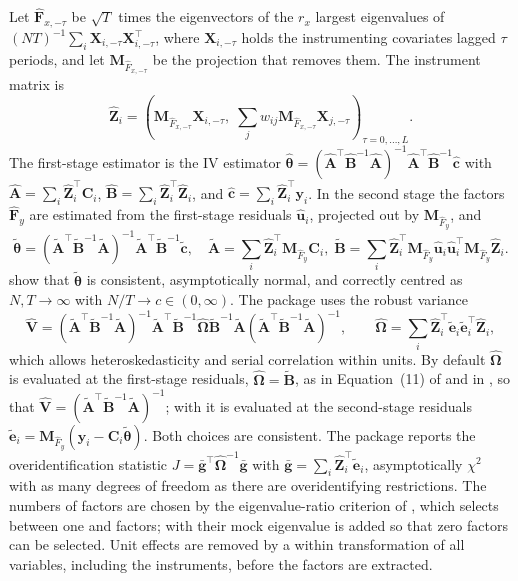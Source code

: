 \documentclass[article]{jss}
\begin{document}
Let $\hat{\bm F}_{x,-\tau}$ be $\sqrt{T}$ times the eigenvectors of the
$r_x$ largest eigenvalues of $(NT)^{-1}\sum_i \bm X_{i,-\tau}\bm X_{i,-\tau}^\top$,
where $\bm X_{i,-\tau}$ holds the instrumenting covariates lagged $\tau$
periods, and let $\bm M_{\hat F_{x,-\tau}}$ be the projection that removes
them. The instrument matrix is
\begin{equation}
\hat{\bm Z}_i = \left(\bm M_{\hat F_{x,-\tau}}\bm X_{i,-\tau},\;
  \textstyle\sum_j w_{ij}\bm M_{\hat F_{x,-\tau}}\bm X_{j,-\tau}\right)_{\tau=0,\dots,L}.
\label{eq:Z}
\end{equation}
The first-stage estimator is the IV estimator
$\hat{\bm\theta} = (\hat{\bm A}^\top\hat{\bm B}^{-1}\hat{\bm A})^{-1}\hat{\bm A}^\top\hat{\bm B}^{-1}\hat{\bm c}$
with $\hat{\bm A}=\sum_i\hat{\bm Z}_i^\top\bm C_i$,
$\hat{\bm B}=\sum_i\hat{\bm Z}_i^\top\hat{\bm Z}_i$, and
$\hat{\bm c}=\sum_i\hat{\bm Z}_i^\top\bm y_i$. In the second stage the
factors $\hat{\bm F}_y$ are estimated from the first-stage residuals
$\hat{\bm u}_i$, projected out by $\bm M_{\hat F_y}$, and
\begin{equation}
\tilde{\bm\theta} = (\tilde{\bm A}^\top\tilde{\bm B}^{-1}\tilde{\bm A})^{-1}\tilde{\bm A}^\top\tilde{\bm B}^{-1}\tilde{\bm c},\quad
\tilde{\bm A} = \sum_i\hat{\bm Z}_i^\top\bm M_{\hat F_y}\bm C_i,\;
\tilde{\bm B} = \sum_i\hat{\bm Z}_i^\top\bm M_{\hat F_y}\hat{\bm u}_i\hat{\bm u}_i^\top\bm M_{\hat F_y}\hat{\bm Z}_i .
\label{eq:2siv}
\end{equation}
\citet{Cui+Sarafidis+Yamagata:2023} show that $\tilde{\bm\theta}$ is
consistent, asymptotically normal, and correctly centred as
$N,T\to\infty$ with $N/T\to c\in(0,\infty)$. The package uses the robust
variance
\begin{equation}
\hat{\bm V} = (\tilde{\bm A}^\top\tilde{\bm B}^{-1}\tilde{\bm A})^{-1}\tilde{\bm A}^\top\tilde{\bm B}^{-1}\hat{\bm\Omega}\tilde{\bm B}^{-1}\tilde{\bm A}(\tilde{\bm A}^\top\tilde{\bm B}^{-1}\tilde{\bm A})^{-1},\qquad
\hat{\bm\Omega}=\sum_i\hat{\bm Z}_i^\top\tilde{\bm e}_i\tilde{\bm e}_i^\top\hat{\bm Z}_i,
\label{eq:V}
\end{equation}
which allows heteroskedasticity and serial correlation within units. By
default $\hat{\bm\Omega}$ is evaluated at the first-stage residuals,
$\hat{\bm\Omega}=\tilde{\bm B}$, as in Equation~(11) of
\citet{Kripfganz+Sarafidis:2025} and in , so that
$\hat{\bm V}=(\tilde{\bm A}^\top\tilde{\bm B}^{-1}\tilde{\bm A})^{-1}$; with
 it is evaluated at the second-stage residuals
$\tilde{\bm e}_i=\bm M_{\hat F_y}(\bm y_i-\bm C_i\tilde{\bm\theta})$. Both choices
are consistent. The package reports the overidentification statistic
$J=\bar{\bm g}^\top\hat{\bm\Omega}^{-1}\bar{\bm g}$ with
$\bar{\bm g}=\sum_i\hat{\bm Z}_i^\top\tilde{\bm e}_i$, asymptotically
$\chi^2$ with as many degrees of freedom as there are overidentifying
restrictions. The numbers of factors are chosen by the eigenvalue-ratio
criterion of \citet{Ahn+Horenstein:2013}, which selects between one and
 factors; with  their mock eigenvalue
is added so that zero factors can be selected. Unit effects are removed by a
within transformation of all variables, including the instruments, before
the factors are extracted.
\end{document}
